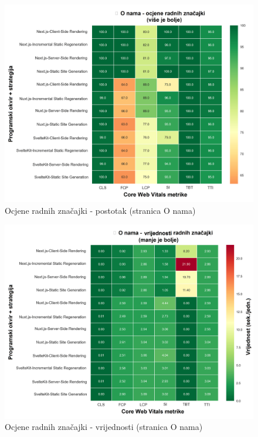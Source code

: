 \begin{figure}[H]
    \centering
    \includegraphics[width=\textwidth]{slike/rezultati/about/about_performance_scores.png}
    \caption{Ocjene radnih značajki - postotak (stranica O nama)}
    \label{fig:testiranje-o-nama-postotak}
\end{figure}

\begin{figure}[H]
    \centering
    \includegraphics[width=\textwidth]{slike/rezultati/about/about_performance_values.png}
    \caption{Ocjene radnih značajki - vrijednosti (stranica O nama)}
    \label{fig:testiranje-o-nama-vrijednosti}
\end{figure}

